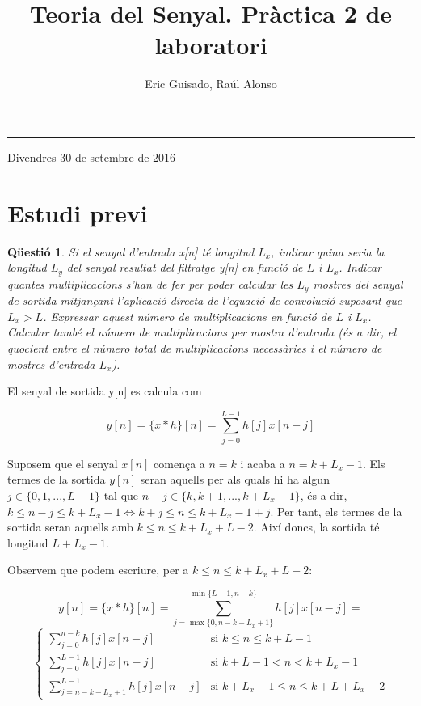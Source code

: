 \documentclass[11pt,a4]{article}
\title{Teoria del Senyal. Pràctica 2 de laboratori}
\author{Eric Guisado, Raúl Alonso}
\numberwithin{equation}{section}
\theoremstyle{thmstyle}
\theoremstyle{thmstyle}
\theoremstyle{thmstyle}
\theoremstyle{thmstyle}
\theoremstyle{thmstyle}
\theoremstyle{thmstyle}
\newtheorem{question}{Qüestió}
\begin{document}
\thispagestyle{empty}

\noindent
{\bf \LARGE \thetitle}

\noindent
\rule{\textwidth}{1pt}

\vspace{15pt}

\noindent
{\Large \theauthor}
\vspace{15pt}

\noindent
{\large Divendres 30 de setembre de 2016}
\vspace{15pt}

\tableofcontents

\section{Estudi previ}
\begin{question}
Si el senyal d’entrada x[n] té longitud $L_x$, indicar quina seria la longitud $L_y$ del senyal resultat del filtratge y[n] en funció de $L$ i $L_x$. Indicar quantes multiplicacions s’han de fer per poder calcular les $L_y$ mostres del senyal de sortida mitjançant l’aplicació directa de l’equació de convolució suposant que $L_x > L$. Expressar aquest número de multiplicacions en funció de $L$ i $L_x$. Calcular també el número de multiplicacions per mostra d’entrada (és a dir, el quocient entre el número total de multiplicacions necessàries i el número de mostres d’entrada $L_x$).
\end{question}

El senyal de sortida y[n] es calcula com 

$$
y[n]=\lbrace x\ast h\rbrace[n]=\sum\limits_{j=0}^{L-1} h[j]x[n-j]
$$

Suposem que el senyal $x[n]$ comença a $n=k$ i acaba a $n=k+L_x-1$. Els termes de la sortida $y[n]$ seran aquells per als quals hi ha algun $j\in\lbrace 0, 1, ..., L-1\rbrace$ tal que $n-j\in \lbrace k, k+1, ..., k+L_x-1\rbrace$, és a dir, $k\leqslant n-j \leqslant k+L_x-1 \Longleftrightarrow k+j\leqslant n \leqslant k+L_x-1+j$. Per tant, els termes de la sortida seran aquells amb $k\leqslant n \leq k+L_x+L-2$. Així doncs, la sortida té longitud $L+L_x-1$.

Observem que podem escriure, per a $k\leqslant n \leq k+L_x+L-2$:

$$
y[n]=\lbrace x\ast h\rbrace[n]=\sum\limits_{j=\max{\lbrace 0, n-k-L_x+1\rbrace}}^{\min{\lbrace L-1,n-k\rbrace}} h[j]x[n-j] = 
$$
$$
\begin{cases}
\sum\limits_{j=0}^{n-k} h[j]x[n-j]  & \text{si $k \leqslant n \leqslant k + L - 1$} \\
\sum\limits_{j=0}^{L-1} h[j]x[n-j]  & \text{si $k+L-1 < n < k + L_x - 1$} \\
\sum\limits_{j=n-k-L_x+1}^{L-1} h[j]x[n-j]  & \text{si $k + L_x - 1 \leqslant n \leqslant k + L + L_x - 2$}
\end{cases}
$$
\end{document}

